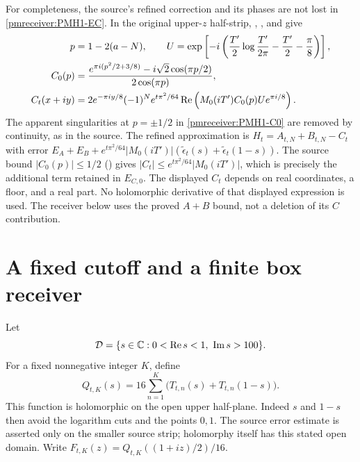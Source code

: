 For completeness, the source's refined correction and its phases are
not lost in \eqref{pmreceiver:PMH1-EC}. In the original upper-$z$ half-strip,
, , and  give
\begin{align}
 p&=1-2(a-N),\qquad
 U=\exp\left[-i\left(\frac{T'}2\log\frac{T'}{2\pi}
                         -\frac{T'}2-\frac\pi8\right)\right],
 \label{pmreceiver:PMH1-phase}\\
 C_0(p)&=\frac{e^{\pi i(p^2/2+3/8)}-i\sqrt2\cos(\pi p/2)}
                 {2\cos(\pi p)},
 \label{pmreceiver:PMH1-C0}\\
 C_t(x+iy)&=2e^{-\pi iy/8}(-1)^N e^{t\pi^2/64}
       \operatorname{Re}\left(M_0(iT')C_0(p)Ue^{\pi i/8}\right).
 \label{pmreceiver:PMH1-C}
\end{align}
The apparent singularities at $p=\pm1/2$ in \eqref{pmreceiver:PMH1-C0} are
removed by continuity, as in the source. The refined approximation
is $H_t=A_{t,N}+B_{t,N}-C_t$ with error
$E_A+E_B+e^{t\pi^2/64}|M_0(iT')|
(\widetilde\epsilon_t(s)+\widetilde\epsilon_t(1-s))$.
The source bound $|C_0(p)|\le1/2$ () gives
$|C_t|\le e^{t\pi^2/64}|M_0(iT')|$, which is precisely the
additional term retained in $E_{C,0}$.
The displayed $C_t$ depends on real coordinates, a floor, and a real
part. No holomorphic derivative of that displayed expression is used.
The receiver below uses the proved $A+B$ bound, not a deletion of its
$C$ contribution.

\section{A fixed cutoff and a finite box receiver}

Let
\[
 \mathcal D=\{s\in\mathbb C:0<\operatorname{Re} s<1,\ \operatorname{Im} s>100\}.
\]
For a fixed nonnegative integer $K$, define
\begin{equation}\label{pmreceiver:PMH2-Q}
 Q_{t,K}(s)=16\sum_{n=1}^K
       \bigl(T_{t,n}(s)+T_{t,n}(1-s)\bigr).
\end{equation}
This function is holomorphic on the open upper half-plane. Indeed
$s$ and $1-s$ then avoid the logarithm cuts and the points $0,1$.
The source error estimate is asserted only on the smaller source
strip; holomorphy itself has this stated open domain.
Write $F_{t,K}(z)=Q_{t,K}((1+iz)/2)/16$.

